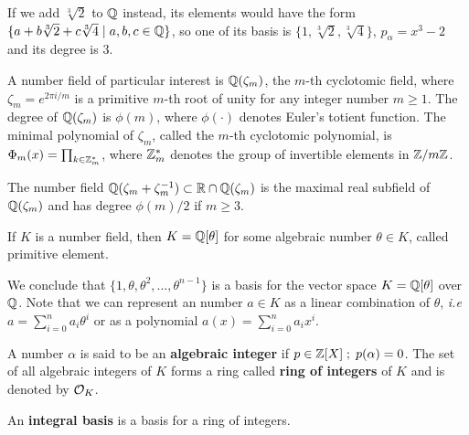 \documentclass[a4paper,12pt]{article}
\begin{document}
\begin{example}
  If we add $\sqrt[3]{2}$ to $\mathbb{Q}$ instead, its elements would have the
  form $\{a + b\sqrt[3]{2} + c\sqrt[3]{4} \;|\; a,b,c \in \mathbb{Q}\}$, so one of
  its basis is $\{1 ,\sqrt[3]{2} ,\sqrt[3]{4}\}$, $p_\alpha = x^3 - 2$ and its degree
  is $3$.
\end{example}

\begin{example}\label{example:cyclotomic-number-field}
  A number field of particular interest is $\mathbb{Q}(\zeta_m)$, the $m$-th cyclotomic field,
  where $\zeta_m = e^{2\pi i /m}$ is a primitive $m$-th root of unity for any
  integer number $m \geq 1$. The degree of $\mathbb{Q}(\zeta_m)$ is $\phi(m)$, where $\phi(\cdot)$
  denotes Euler’s totient function. The minimal polynomial of $\zeta_m$, called
  the $m$-th cyclotomic polynomial, is $\Phi_m(x) = \prod_{k \in \mathbb{Z}_{m}^*}$, where $\mathbb{Z}^*_m$ denotes the group of invertible elements in $\mathbb{Z}/m\mathbb{Z}$.
\end{example}

\begin{example}
  \label{example:maximal-real-subfield}
  The number field $\mathbb{Q}(\zeta_m + \zeta_m^{-1}) \subset \mathbb{R} \cap \mathbb{Q}(\zeta_m)$ is the maximal real subfield of $\mathbb{Q}(\zeta_m)$ and has degree $\phi(m)/2$ if $m \geq 3$.
\end{example}

\begin{theorem}
   If $K$ is a number field, then $K = \mathbb{Q}[\theta]$ for some
  algebraic number $\theta \in K$, called primitive element.
\end{theorem}

We conclude that \(\{1, \theta, \theta^2, ... , \theta^{n-1}\}\) is a basis for the vector
space \(K = \mathbb{Q}[\theta]\) over \(\mathbb{Q}\). Note that we can represent an number \(a \in K\) as a linear combination of \(\theta\), \emph{i.e} \(a = \sum^n_{i=0}{a_i\theta^i}\) or as a polynomial \(a(x) = \sum^n_{i=0}{a_ix^i}\).

\begin{definition}
A number $\alpha$ is said to be an \textbf{algebraic integer} if $ p \in \mathbb{Z}[X] \;;\; p(\alpha) = 0$. The set of all algebraic integers of $K$ forms a ring called \textbf{ring of integers} of $K$ and is denoted by $\mathcal{O}_K$.
\end{definition}

\begin{definition}
An \textbf{integral basis} is a basis for a ring of integers. 
\end{definition}
\end{document}
